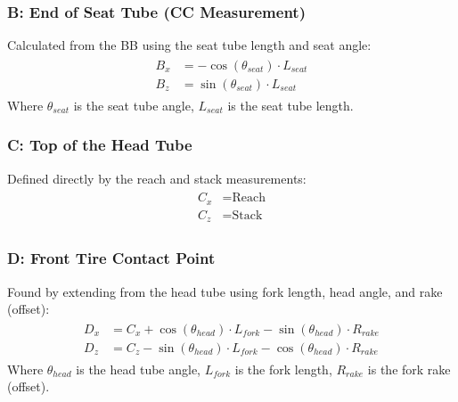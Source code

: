 \documentclass[letterpaper,10pt,english]{jupyterBook}
\begin{document}
\subsubsection{B: End of Seat Tube (C\sphinxhyphen{}C Measurement)}
\label{\detokenize{Setting the Rig:b-end-of-seat-tube-c-c-measurement}}
\sphinxAtStartPar
Calculated from the BB using the seat tube length and seat angle:
\begin{equation*}
\begin{split}
\begin{aligned}
B_x &= -\cos(\theta_{seat}) \cdot L_{seat} \\
B_z &= \sin(\theta_{seat}) \cdot L_{seat}
\end{aligned}
\end{split}
\end{equation*}
\sphinxAtStartPar
Where \(\theta_{seat}\) is the seat tube angle, \(L_{seat}\) is the seat tube length.


\subsubsection{C: Top of the Head Tube}
\label{\detokenize{Setting the Rig:c-top-of-the-head-tube}}
\sphinxAtStartPar
Defined directly by the reach and stack measurements:
\begin{equation*}
\begin{split}
\begin{aligned}
C_x &= \text{Reach} \\
C_z &= \text{Stack}
\end{aligned}
\end{split}
\end{equation*}

\subsubsection{D: Front Tire Contact Point}
\label{\detokenize{Setting the Rig:d-front-tire-contact-point}}
\sphinxAtStartPar
Found by extending from the head tube using fork length, head angle, and rake (offset):
\begin{equation*}
\begin{split}
\begin{aligned}
D_x &= C_x + \cos(\theta_{head}) \cdot L_{fork} - \sin(\theta_{head}) \cdot R_{rake} \\
D_z &= C_z - \sin(\theta_{head}) \cdot L_{fork} - \cos(\theta_{head}) \cdot R_{rake}
\end{aligned}
\end{split}
\end{equation*}
\sphinxAtStartPar
Where \(\theta_{head}\) is the head tube angle, \(L_{fork}\) is the fork length, \(R_{rake}\) is the fork rake (offset).
\end{document}
